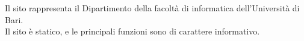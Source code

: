 Il sito rappresenta il Dipartimento della facoltà di informatica dell'Università di Bari. \\
Il sito è statico, e le principali funzioni sono di carattere informativo. 